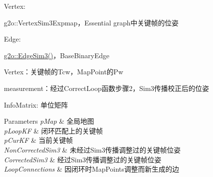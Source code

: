 \begin{DoxyEnumerate}
\item Vertex\+:
\begin{DoxyItemize}
\item g2o\+::\+Vertex\+Sim3\+Expmap，\+Essential graph中关键帧的位姿
\end{DoxyItemize}
\item Edge\+:
\begin{DoxyItemize}
\item \mbox{\hyperlink{classg2o_1_1_edge_sim3}{g2o\+::\+Edge\+Sim3()}}，\+Base\+Binary\+Edge
\begin{DoxyItemize}
\item Vertex：关键帧的\+Tcw，\+Map\+Point的\+Pw
\item measurement：经过\+Correct\+Loop函数步骤2，\+Sim3传播校正后的位姿
\item Info\+Matrix\+: 单位矩阵 ~\newline
 
\begin{DoxyParams}{Parameters}
{\em p\+Map} & 全局地图 \\
\hline
{\em p\+Loop\+KF} & 闭环匹配上的关键帧 \\
\hline
{\em p\+Cur\+KF} & 当前关键帧 \\
\hline
{\em Non\+Corrected\+Sim3} & 未经过\+Sim3传播调整过的关键帧位姿 \\
\hline
{\em Corrected\+Sim3} & 经过\+Sim3传播调整过的关键帧位姿 \\
\hline
{\em Loop\+Connections} & 因闭环时\+Map\+Points调整而新生成的边 \\
\hline
\end{DoxyParams}

\end{DoxyItemize}
\end{DoxyItemize}
\end{DoxyEnumerate}\mbox{\label{class_o_r_b___s_l_a_m2_1_1_optimizer_a91fbb960965c99e9802a5de45515813c}} 
